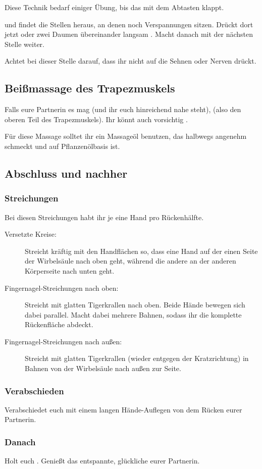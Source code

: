 Diese Technik bedarf einiger Übung, bis das mit dem Abtasten klappt.

 und findet die Stellen heraus, an denen noch Verspannungen sitzen. Drückt dort jetzt  oder zwei Daumen übereinander langsam . Macht danach mit der nächsten Stelle weiter.

Achtet bei dieser Stelle darauf, dass ihr nicht auf die Sehnen oder Nerven drückt.


\subsection{Beißmassage des Trapezmuskels}

Falls eure Partnerin es mag (und ihr euch hinreichend nahe steht),  (also den oberen Teil des Trapezmuskels). Ihr könnt auch vorsichtig .

Für diese Massage solltet ihr ein Massageöl benutzen, das halbwegs angenehm schmeckt und auf Pflanzenölbasis ist.


\subsection{Abschluss und nachher}

\subsubsection{Streichungen}

Bei diesen Streichungen habt ihr je eine Hand pro Rückenhälfte.

\begin{description}
  \item [Versetzte Kreise:] Streicht kräftig mit den Handflächen so, dass eine Hand auf der einen Seite der Wirbelsäule nach oben geht, während die andere an der anderen Körperseite nach unten geht.
  \item [Fingernagel-Streichungen nach oben:] Streicht mit glatten Tigerkrallen  nach oben. Beide Hände bewegen sich dabei parallel. Macht dabei mehrere Bahnen, sodass ihr die komplette Rückenfläche abdeckt.
  \item [Fingernagel-Streichungen nach außen:] Streicht mit glatten Tigerkrallen (wieder entgegen der Kratzrichtung) in Bahnen von der Wirbelsäule nach außen zur Seite.
\end{description}


\subsubsection{Verabschieden}

Verabschiedet euch mit einem langen Hände-Auflegen von dem Rücken eurer Partnerin.

\subsubsection{Danach}
 Holt euch . Genießt das entspannte, glückliche  eurer Partnerin.
